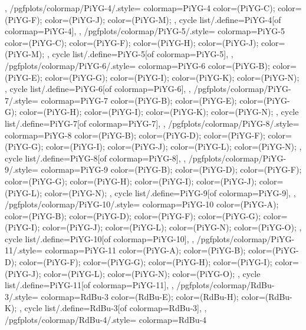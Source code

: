 {{  },
  /pgfplots/colormap/PiYG-4/.style={
    colormap={PiYG-4}{
      color=(PiYG-C);
      color=(PiYG-F);
      color=(PiYG-J);
      color=(PiYG-M);
    },
    cycle list/.define={PiYG-4}{[of colormap=PiYG-4]},
  },
  /pgfplots/colormap/PiYG-5/.style={
    colormap={PiYG-5}{
      color=(PiYG-C);
      color=(PiYG-F);
      color=(PiYG-H);
      color=(PiYG-J);
      color=(PiYG-M);
    },
    cycle list/.define={PiYG-5}{[of colormap=PiYG-5]},
  },
  /pgfplots/colormap/PiYG-6/.style={
    colormap={PiYG-6}{
      color=(PiYG-B);
      color=(PiYG-E);
      color=(PiYG-G);
      color=(PiYG-I);
      color=(PiYG-K);
      color=(PiYG-N);
    },
    cycle list/.define={PiYG-6}{[of colormap=PiYG-6]},
  },
  /pgfplots/colormap/PiYG-7/.style={
    colormap={PiYG-7}{
      color=(PiYG-B);
      color=(PiYG-E);
      color=(PiYG-G);
      color=(PiYG-H);
      color=(PiYG-I);
      color=(PiYG-K);
      color=(PiYG-N);
    },
    cycle list/.define={PiYG-7}{[of colormap=PiYG-7]},
  },
  /pgfplots/colormap/PiYG-8/.style={
    colormap={PiYG-8}{
      color=(PiYG-B);
      color=(PiYG-D);
      color=(PiYG-F);
      color=(PiYG-G);
      color=(PiYG-I);
      color=(PiYG-J);
      color=(PiYG-L);
      color=(PiYG-N);
    },
    cycle list/.define={PiYG-8}{[of colormap=PiYG-8]},
  },
  /pgfplots/colormap/PiYG-9/.style={
    colormap={PiYG-9}{
      color=(PiYG-B);
      color=(PiYG-D);
      color=(PiYG-F);
      color=(PiYG-G);
      color=(PiYG-H);
      color=(PiYG-I);
      color=(PiYG-J);
      color=(PiYG-L);
      color=(PiYG-N);
    },
    cycle list/.define={PiYG-9}{[of colormap=PiYG-9]},
  },
  /pgfplots/colormap/PiYG-10/.style={
    colormap={PiYG-10}{
      color=(PiYG-A);
      color=(PiYG-B);
      color=(PiYG-D);
      color=(PiYG-F);
      color=(PiYG-G);
      color=(PiYG-I);
      color=(PiYG-J);
      color=(PiYG-L);
      color=(PiYG-N);
      color=(PiYG-O);
    },
    cycle list/.define={PiYG-10}{[of colormap=PiYG-10]},
  },
  /pgfplots/colormap/PiYG-11/.style={
    colormap={PiYG-11}{
      color=(PiYG-A);
      color=(PiYG-B);
      color=(PiYG-D);
      color=(PiYG-F);
      color=(PiYG-G);
      color=(PiYG-H);
      color=(PiYG-I);
      color=(PiYG-J);
      color=(PiYG-L);
      color=(PiYG-N);
      color=(PiYG-O);
    },
    cycle list/.define={PiYG-11}{[of colormap=PiYG-11]},
  },
  /pgfplots/colormap/RdBu-3/.style={
    colormap={RdBu-3}{
      color=(RdBu-E);
      color=(RdBu-H);
      color=(RdBu-K);
    },
    cycle list/.define={RdBu-3}{[of colormap=RdBu-3]},
  },
  /pgfplots/colormap/RdBu-4/.style={
    colormap={RdBu-4}{
}}}
